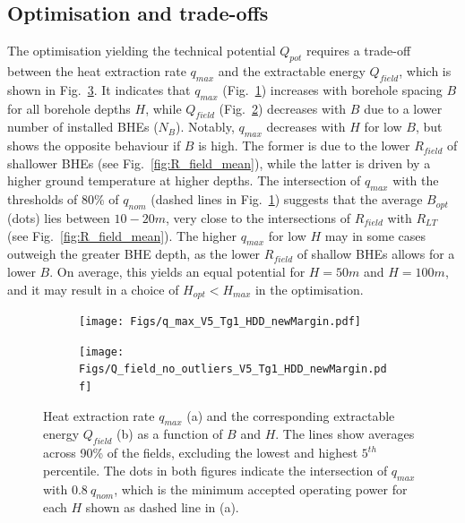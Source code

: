 \subsection{Optimisation and trade-offs}

The optimisation yielding the technical potential $Q_{pot}$ requires a trade-off between the heat extraction rate $q_{max}$ and the extractable energy $Q_{field}$, which is shown in Fig.~\ref{fig:optimisation}.
%
It indicates that $q_{max}$ (Fig.~\ref{fig:q_max}) increases with borehole spacing $B$ for all borehole depths $H$, while $Q_{field}$ (Fig.~\ref{fig:Q_field}) decreases with $B$ due to a lower number of installed BHEs ($N_B$).
Notably, $q_{max}$ decreases with $H$ for low $B$, but shows the opposite behaviour if $B$ is high.
The former is due to the lower $R_{field}$ of shallower BHEs (see Fig.~\ref{fig:R_field_mean}), while the latter is driven by a higher ground temperature at higher depths. 
%
The intersection of $q_{max}$ with the thresholds of 80\% of $q_{nom}$ (dashed lines in Fig.~\ref{fig:q_max}) suggests that the average $B_{opt}$ (dots) lies between $10-20m$, very close to the intersections of $R_{field}$ with $R_{LT}$ (see Fig.~\ref{fig:R_field_mean}). 
The higher $q_{max}$ for low $H$ may in some cases outweigh the greater BHE depth, as the lower $R_{field}$ of shallow BHEs allows for a lower $B$. 
On average, this yields an equal potential for $H = 50m$ and $H = 100m$, and it may result in a choice of $H_{opt} < H_{max}$ in the optimisation.


\begin{figure}[ht!]
\centering
\begin{subfigure}{.49\textwidth}
  \centering
  \texttt{[image: Figs/q\_max\_V5\_Tg1\_HDD\_newMargin.pdf]} 
  \subcaption{}
  \label{fig:q_max}
\end{subfigure}
\begin{subfigure}{.49\textwidth}
  \centering
  \texttt{[image: Figs/Q\_field\_no\_outliers\_V5\_Tg1\_HDD\_newMargin.pdf]} 
  \subcaption{}
  \label{fig:Q_field}
\end{subfigure}

\caption{Heat extraction rate $q_{max}$ (a) and  the corresponding extractable energy $Q_{field}$ (b) as a function of $B$ and $H$. 
The lines show averages across 90\% of the fields, excluding the lowest and highest $5^{th}$ percentile.
The dots in both figures indicate the intersection of $q_{max}$ with $0.8 \ q_{nom}$, which is the minimum accepted operating power for each $H$ shown as dashed line in (a).}
\label{fig:optimisation}
\end{figure}


